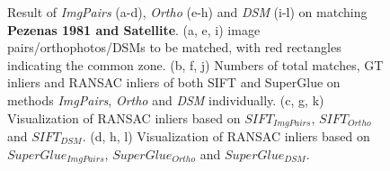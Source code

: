 \begin{figure}[htbp]
\begin{center}
{\begin{minipage}[t]{0.48\linewidth}
			\end{minipage}%
		}
		\caption{{\scriptsize Result of \textit{ImgPairs} (a-d), \textit{Ortho} (e-h) and \textit{DSM} (i-l) on matching \textbf{Pezenas 1981 and Satellite}. (a, e, i) image pairs/orthophotos/DSMs to be matched, with red rectangles indicating the common zone. (b, f, j) Numbers of total matches, GT inliers and RANSAC inliers of both SIFT and SuperGlue on methods \textit{ImgPairs}, \textit{Ortho} and \textit{DSM} individually. (c, g, k) Visualization of RANSAC inliers based on $SIFT_{ImgPairs}$, $SIFT_{Ortho}$ and $SIFT_{DSM}$. (d, h, l) Visualization of RANSAC inliers based on $SuperGlue_{ImgPairs}$, $SuperGlue_{Ortho}$ and $SuperGlue_{DSM}$.}}        
		\label{MatchVizPezenas-Satellite1981DSM}
	\end{center}
\end{figure} 



